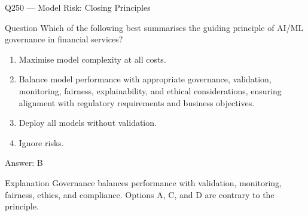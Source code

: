 \documentclass[aspectratio=169,8pt]{beamer}
\begin{document}
																																																									\begin{frame}{Q250 --- Model Risk: Closing Principles}
																																																										\begin{block}{Question}
																																																											Which of the following best summarises the guiding principle of AI/ML governance in financial services?
																																																											\begin{enumerate}
																																																												\item Maximise model complexity at all costs.
																																																												\item Balance model performance with appropriate governance, validation, monitoring, fairness, explainability, and ethical considerations, ensuring alignment with regulatory requirements and business objectives.
																																																												\item Deploy all models without validation.
																																																												\item Ignore risks.
																																																											\end{enumerate}  \end{block}
																																																											\begin{exampleblock}{Answer: B}\end{exampleblock}
																																																											\begin{block}{Explanation}
																																																												Governance balances performance with validation, monitoring, fairness, ethics, and compliance. Options A, C, and D are contrary to the principle.
																																																											\end{block}
																																																										\end{frame}
																																																										
																																																										
																																																										
																																																										
																																																										
																																																										
																																																										
																																																										
																																																									
\end{document}
